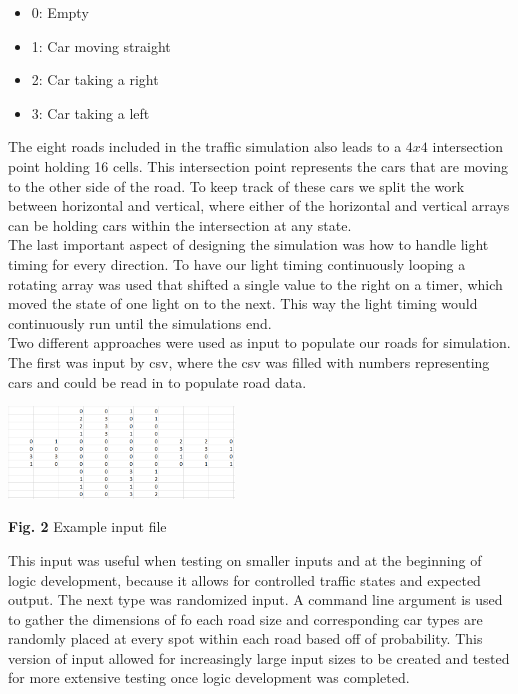 \documentclass[conference]{IEEEtran}
\begin{document}
\begin{itemize}
	\item 0: Empty
	\item 1: Car moving straight
	\item 2: Car taking a right
	\item 3: Car taking a left \\
\end{itemize}

The eight roads included in the traffic simulation also leads to a $4x4$ intersection point holding 16 cells. This intersection point represents the cars that are moving to the other side of the road. To keep track of these cars we split the work between horizontal and vertical, where either of the horizontal and vertical arrays can be holding cars within the intersection at any state. \\
The last important aspect of designing the simulation was how to handle light timing for every direction. To have our light timing continuously looping a rotating array was used that shifted a single value to the right on a timer, which moved the state of one light on to the next. This way the light timing would continuously run until the simulations end.\\

\hspace*{.2cm} Two different approaches were used as input to populate our roads for simulation. The first was input by csv, where the csv was filled with numbers representing cars and could be read in to populate road data. 

\includegraphics[width=0.45\textwidth]{input}
\begin{center}
	\textbf{Fig. 2} Example input file  \\
\end{center}

This input was useful when testing on smaller inputs and at the beginning of logic development, because it allows for controlled traffic states and expected output. The next type was randomized input. A command line argument is used to gather the dimensions of fo each road size and corresponding car types are randomly placed at every spot within each road based off of probability. This version of input allowed for increasingly large input sizes to be created and tested for more extensive testing once logic development was completed. \\
\end{document}
